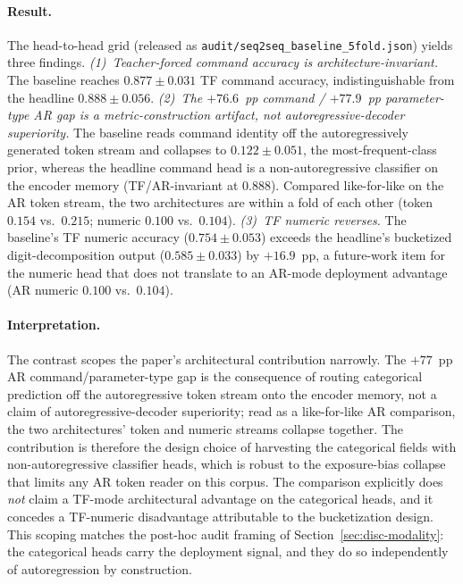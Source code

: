 \documentclass[sensors,article,submit,moreauthors,pdftex]{Definitions/mdpi}
\begin{document}
\paragraph{Result.} The head-to-head grid (released as \texttt{audit/seq2seq\_baseline\_5fold.json}) yields three findings. \emph{(1)~Teacher-forced command accuracy is architecture-invariant.} The baseline reaches $0.877 \pm 0.031$ TF command accuracy, indistinguishable from the headline $0.888 \pm 0.056$. \emph{(2)~The $+76.6$~pp command / $+77.9$~pp parameter-type AR gap is a metric-construction artifact, not autoregressive-decoder superiority.} The baseline reads command identity off the autoregressively generated token stream and collapses to $0.122 \pm 0.051$, the most-frequent-class prior, whereas the headline command head is a non-autoregressive classifier on the encoder memory (TF/AR-invariant at $0.888$). Compared like-for-like on the AR token stream, the two architectures are within a fold of each other (token $0.154$ vs.\ $0.215$; numeric $0.100$ vs.\ $0.104$). \emph{(3)~TF numeric reverses.} The baseline's TF numeric accuracy ($0.754 \pm 0.053$) exceeds the headline's bucketized digit-decomposition output ($0.585 \pm 0.033$) by $+16.9$~pp, a future-work item for the numeric head that does not translate to an AR-mode deployment advantage (AR numeric $0.100$ vs.\ $0.104$).


\paragraph{Interpretation.} The contrast scopes the paper's architectural contribution narrowly. The $+77$~pp AR command/parameter-type gap is the consequence of routing categorical prediction off the autoregressive token stream onto the encoder memory, not a claim of autoregressive-decoder superiority; read as a like-for-like AR comparison, the two architectures' token and numeric streams collapse together. The contribution is therefore the design choice of harvesting the categorical fields with non-autoregressive classifier heads, which is robust to the exposure-bias collapse that limits any AR token reader on this corpus. The comparison explicitly does \emph{not} claim a TF-mode architectural advantage on the categorical heads, and it concedes a TF-numeric disadvantage attributable to the bucketization design. This scoping matches the post-hoc audit framing of Section~\ref{sec:disc-modality}: the categorical heads carry the deployment signal, and they do so independently of autoregression by construction.
\end{document}
